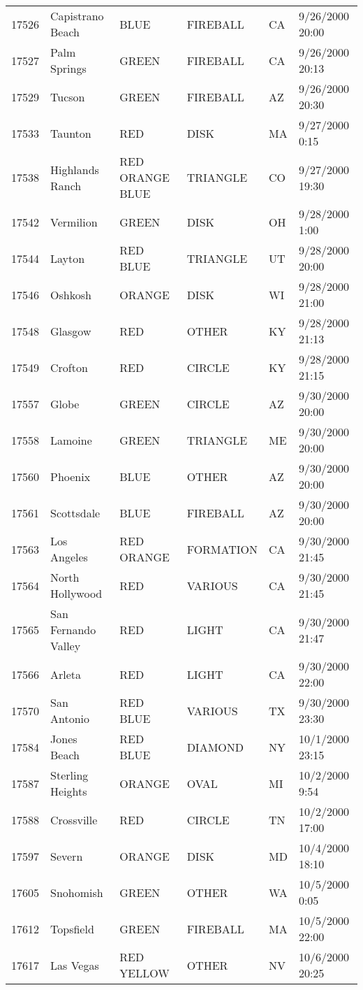 \begin{tabular}{llllll}
17526 & Capistrano Beach & BLUE & FIREBALL & CA & 9/26/2000 20:00 \\
17527 & Palm Springs & GREEN & FIREBALL & CA & 9/26/2000 20:13 \\
17529 & Tucson & GREEN & FIREBALL & AZ & 9/26/2000 20:30 \\
17533 & Taunton & RED & DISK & MA & 9/27/2000 0:15 \\
17538 & Highlands Ranch & RED ORANGE BLUE & TRIANGLE & CO & 9/27/2000 19:30 \\
17542 & Vermilion & GREEN & DISK & OH & 9/28/2000 1:00 \\
17544 & Layton & RED BLUE & TRIANGLE & UT & 9/28/2000 20:00 \\
17546 & Oshkosh & ORANGE & DISK & WI & 9/28/2000 21:00 \\
17548 & Glasgow & RED & OTHER & KY & 9/28/2000 21:13 \\
17549 & Crofton & RED & CIRCLE & KY & 9/28/2000 21:15 \\
17557 & Globe & GREEN & CIRCLE & AZ & 9/30/2000 20:00 \\
17558 & Lamoine & GREEN & TRIANGLE & ME & 9/30/2000 20:00 \\
17560 & Phoenix & BLUE & OTHER & AZ & 9/30/2000 20:00 \\
17561 & Scottsdale & BLUE & FIREBALL & AZ & 9/30/2000 20:00 \\
17563 & Los Angeles & RED ORANGE & FORMATION & CA & 9/30/2000 21:45 \\
17564 & North Hollywood & RED & VARIOUS & CA & 9/30/2000 21:45 \\
17565 & San Fernando Valley & RED & LIGHT & CA & 9/30/2000 21:47 \\
17566 & Arleta & RED & LIGHT & CA & 9/30/2000 22:00 \\
17570 & San Antonio & RED BLUE & VARIOUS & TX & 9/30/2000 23:30 \\
17584 & Jones Beach & RED BLUE & DIAMOND & NY & 10/1/2000 23:15 \\
17587 & Sterling Heights & ORANGE & OVAL & MI & 10/2/2000 9:54 \\
17588 & Crossville & RED & CIRCLE & TN & 10/2/2000 17:00 \\
17597 & Severn & ORANGE & DISK & MD & 10/4/2000 18:10 \\
17605 & Snohomish & GREEN & OTHER & WA & 10/5/2000 0:05 \\
17612 & Topsfield & GREEN & FIREBALL & MA & 10/5/2000 22:00 \\
17617 & Las Vegas & RED YELLOW & OTHER & NV & 10/6/2000 20:25 \\

\end{tabular}
